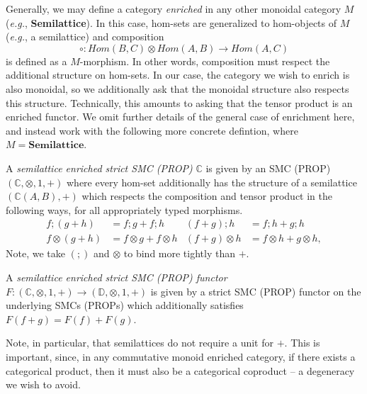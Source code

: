 Generally,  we may define a category \textit{enriched} in any other monoidal category $M$ (\textit{e.g.},  \textbf{Semilattice}).  In this case,  hom-sets are generalized to hom-objects of $M$ (\textit{e.g.},  a semilattice) and composition 
\[
	\circ: Hom(B,C) \otimes Hom(A,B) \to Hom(A,C)
\]
is defined as a $M$-morphism.  In other words,  composition must respect the additional structure on hom-sets.  
In our case,  the category we wish to enrich is also monoidal,  so we additionally ask that the monoidal structure also respects this structure.  Technically, this amounts to asking that the tensor product is an enriched functor. 
We omit further details of the general case of enrichment here, and instead work with the following more concrete defintion, where $M = \textbf{Semilattice}$. 



\begin{definition}
A \textit{semilattice enriched strict SMC (PROP)}  $\mathbb{C}$ is given by an SMC (PROP) $(\mathbb{C}, \otimes, 1,+)$ where every hom-set additionally has the structure of a semilattice $(\mathbb{C}(A,B), +)$ which respects the composition and tensor product in the following ways,  for all appropriately typed morphisms. 
\begin{align*}
f ; (g+h) &= f;g + f;h &
(f+g) ; h &= f;h + g;h \\
f \otimes (g+h) &= f \otimes g + f \otimes h & 
(f+g) \otimes h &= f \otimes h + g \otimes h,
\end{align*}
Note,  we take $(;\!)$ and $\otimes$ to bind more tightly than $+$.

A \textit{semilattice enriched strict SMC (PROP) functor} $F: (\mathbb{C}, \otimes, 1,+) \to (\mathbb{D}, \otimes, 1,+)$ is given by a strict SMC (PROP) functor on the underlying SMCs (PROPs) which additionally satisfies $F(f+g) = F(f)+F(g)$. 
\end{definition}
Note, in particular,  that semilattices do not require a unit for $+$. {This is important, since, in any commutative monoid enriched category,  if there exists a categorical product, then it must also be a categorical coproduct -- a degeneracy we wish to avoid.}


